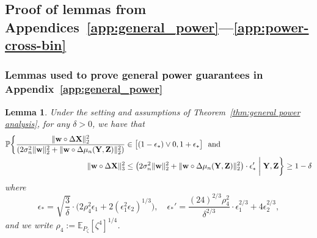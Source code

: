 \documentclass[12pt]{article}
\newtheorem{lemma}[theorem]{Lemma}
\newcommand{\Ep}[2]{\mathbb{E}_{{#1}}\left[{#2}\right]}
\newcommand{\bX}{\mathbf{X}}
\newcommand{\bY}{\mathbf{Y}}
\newcommand{\bZ}{\mathbf{Z}}
\newcommand{\bw}{\mathbf{w}}
\begin{document}
\subsection{Proof of lemmas from Appendices~\ref{app:general_power}—\ref{app:power-cross-bin}}\label{app:lemmas-from-appendix-c1c4}
\subsubsection{Lemmas used to prove general power guarantees in Appendix~\ref{app:general_power}}
\begin{lemma}\label{lem:concentration_L2_L3_for_DeltaX}
    Under the setting and assumptions of Theorem~\ref{thm:general power analysis}, 
    for any $\delta>0$, we have that
    \begin{align*}
        \mathbb{P}\biggl\{\frac{\|\bw\circ \Delta\bX\|^2_2}{\left(2\sigma_n^2\|\bw\|^2_2 +   \|\bw\circ \Delta\mu_n(\bY,\bZ)\|^2_2\right)} &\in \bigl[(1 -\epsilon_*)\vee 0,1+\epsilon_*\bigr]~~\text{and}\\
        \|\bw\circ\Delta\bX\|^2_3 &\leq \left(2\sigma_n^2\|\bw\|^2_2 +   \|\bw\circ \Delta\mu_n(\bY,\bZ)\|^2_2\right)\cdot \epsilon_*'\biggm| \bY,\bZ\biggr\}\geq 1-\delta
    \end{align*}
    where
    \[\epsilon_* = \sqrt{\frac{3}{\delta}}\cdot\biggl(  2\rho^2_4 \epsilon_1 + 2(\epsilon_1^2\epsilon_2)^{1/3}\biggr), \quad \epsilon_*' = \frac{(24)^{2/3}\rho_4^2}{\delta^{2/3}}\cdot\epsilon_1^{2/3} + 4\epsilon_2^{2/3},\]
    and we write $\rho_4:=\Ep{P_\zeta}{\zeta^4}^{1/4}$.
    \end{lemma}
\end{document}
